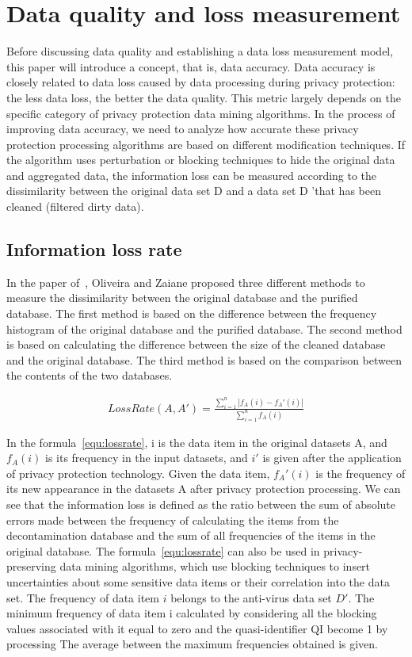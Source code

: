 \documentclass[journal,transmag]{IEEEtran}
\begin{document}
\section{Data quality and loss measurement} \label{informationlossmodel}
Before discussing data quality and establishing a data loss measurement model, this paper will introduce a concept, that is, data accuracy. Data accuracy is closely related to data loss caused by data processing during privacy protection: the less data loss, the better the data quality. This metric largely depends on the specific category of privacy protection data mining algorithms. In the process of improving data accuracy, we need to analyze how accurate these privacy protection processing algorithms are based on different modification techniques. If the algorithm uses perturbation or blocking techniques to hide the original data and aggregated data, the information loss can be measured according to the dissimilarity between the original data set D and a data set D 'that has been cleaned (filtered dirty data).

\subsection{Information loss rate}

In the paper of~\cite{oliveira2002privacy}, Oliveira and Zaiane proposed three different methods to measure the dissimilarity between the original database and the purified database. The first method is based on the difference between the frequency histogram of the original database and the purified database. The second method is based on calculating the difference between the size of the cleaned database and the original database. The third method is based on the comparison between the contents of the two databases.


\begin{eqnarray} \label{equ:lossrate}
LossRate(A,A')= \frac{\sum_{i=1}^n |f_A (i)-f_A' (i)|}{ \sum_{i=1}^n f_A (i)}
\end{eqnarray}

In the formula~\ref{equ:lossrate}, i is the data item in the original datasets A, and $ f_A (i) $ is its frequency in the input datasets, and $ i'$ is given after the application of privacy protection technology. Given the data item, $ f_A '(i) $ is the frequency of its new appearance in the datasets A after privacy protection processing. We can see that the information loss is defined as the ratio between the sum of absolute errors made between the frequency of calculating the items from the decontamination database and the sum of all frequencies of the items in the original database. The formula~\ref{equ:lossrate} can also be used in privacy-preserving data mining algorithms, which use blocking techniques to insert uncertainties about some sensitive data items or their correlation into the data set. The frequency of data item $ i $ belongs to the anti-virus data set $ D '$. The minimum frequency of data item i calculated by considering all the blocking values associated with it equal to zero and the quasi-identifier QI become 1 by processing The average between the maximum frequencies obtained is given.
\end{document}
